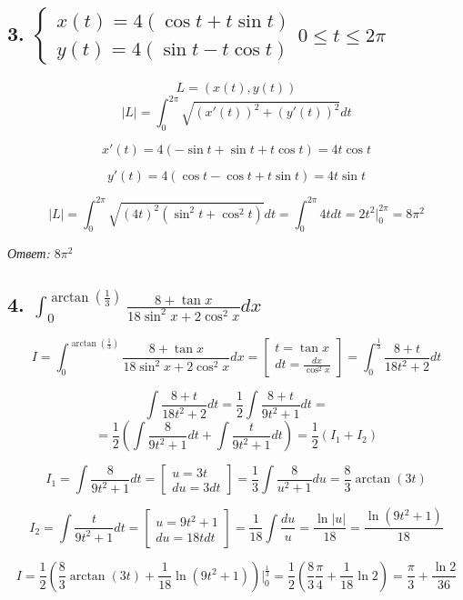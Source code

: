 \documentclass[a4paper]{article}
\begin{document}
\subsection*{3. $\begin{cases} x(t) = 4( \cos t + t \sin t) \\ y(t) = 4 ( \sin t - t \cos t) \end{cases} 0 \leq t \leq 2 \pi$}

\[L = \left( x(t), y(t) \right)\]
\[|L| = \int_0^{2 \pi} \sqrt{(x'(t))^2 + (y'(t))^2} dt\]


\[ x'(t) = 4(- \sin t + \sin t + t \cos t) = 4 t \cos t\]

\[ y'(t) = 4(\cos t - \cos t + t \sin t) = 4 t \sin t\]

\[ |L| = \int_0^{2 \pi} \sqrt{(4t)^2 (\sin^2 t + \cos^2 t)} dt = \int _0^{2 \pi} 4t dt = 2t^2 \bigg|_0^{2 \pi} = 8 \pi^2 \]

\textit{Ответ: $8 \pi^2$}

\subsection*{4. $\displaystyle \int_0^{\arctan \left( \frac{1}{3} \right)} \frac{8+\tan x}{18 \sin^2 x + 2 \cos^2 x} dx$}

\[ 
I = \int_0^{\arctan \left( \frac{1}{3} \right)} \frac{8+\tan x}{18 \sin^2 x + 2 \cos^2 x} dx = \begin{bmatrix}
t = \tan x \\ dt = \frac{dx}{\cos^2 x}
\end{bmatrix} = \int_0^{\frac{1}{3}} \frac{8+t}{18t^2+2}dt \]

\[ \int \frac{8+t}{18t^2+2}dt = \frac{1}{2} \int \frac{8+t}{9t^2+1} dt = \]
 \[ =\frac{1}{2} \left( \int \frac{8}{9t^2+1} dt + \int \frac{t}{9t^2 + 1} dt \right) = \frac{1}{2} (I_1 + I_2)
\]

\[ I_1 =  \int \frac{8}{9t^2+1} dt = \begin{bmatrix}
u = 3t \\ du = 3dt
\end{bmatrix} = \frac{1}{3} \int \frac{8}{u^2+1} du = \frac{8}{3} \arctan(3t) \]

\[ I_2 =  \int \frac{t}{9t^2 + 1} dt = \begin{bmatrix}
u = 9t^2+1 \\ du = 18t dt
\end{bmatrix} = \frac{1}{18} \int \frac{du}{u} = \frac{\ln|u|}{18} = \frac{\ln(9t^2+1)}{18} \]

\[ I = \frac{1}{2} \left( \frac{8}{3} \arctan (3t) + \frac{1}{18} \ln (9t^2 + 1) \right) \bigg|_0^{\frac{1}{3}} = \frac{1}{2} \left( \frac{8}{3} \frac{\pi}{4} + \frac{1}{18} \ln 2 \right) = \frac{\pi}{3} + \frac{\ln 2}{36} \]
\end{document}
